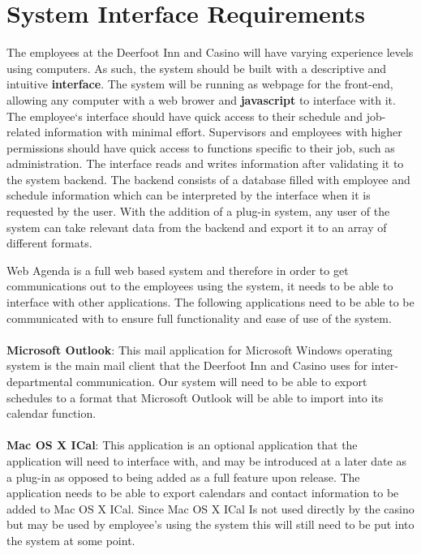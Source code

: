 \documentclass[letterpaper,12pt]{report}
\begin{document}
\newpage
\section{System Interface Requirements}
\hspace{1cm}The employees at the Deerfoot Inn and Casino will have varying experience levels using computers. As such, the system should be built with a descriptive and intuitive \textbf{interface}. The system will be running as webpage for the front-end, allowing any computer with a web brower and \textbf{javascript} to interface with it. The employee`s interface should have quick access to their schedule and job-related information with minimal effort. Supervisors and employees with higher permissions should have quick access to functions specific to their job, such as administration. The interface reads and writes information after validating it to the system backend. The backend consists of a database filled with employee and schedule information which can be interpreted by the interface when it is requested by the user. With the addition of a plug-in system, any user of the system can take relevant data from the backend and export it to an array of different formats.

Web Agenda is a full web based system and therefore in order to get communications out to the employees using the system, it needs to be able to interface with other applications. The following applications need to be able to be communicated with to ensure full functionality and ease of use of the system.
\paragraph*{}\hspace{0.6cm}\textbf{Microsoft Outlook}: This mail application for Microsoft Windows operating system is the main mail client that the Deerfoot Inn and Casino uses for inter-departmental communication. Our system will need to be able to export schedules to a format that  Microsoft Outlook will be able to import into its calendar function.
\paragraph*{}\hspace{0.6cm}\textbf{Mac OS X ICal}: This application is an optional application that the application will need to interface with, and may be introduced at a later date as a plug-in as opposed to being added as a full feature upon release. The application needs to be able to export calendars and contact information to be added to Mac OS X ICal. Since Mac OS X ICal Is not used directly by the casino but may be used by employee’s using the system this will still need to be put into the system at some point.
\end{document}
